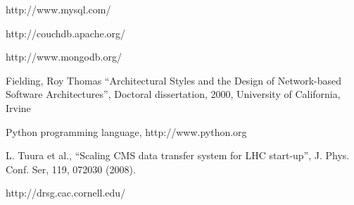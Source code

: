 \documentclass[3p,times]{elsarticle}
\begin{document}
\begin{thebibliography}{00}
http://www.mysql.com/

http://couchdb.apache.org/

http://www.mongodb.org/

Fielding, Roy Thomas ``Architectural Styles and the Design of 
Network-based Software Architectures'', Doctoral dissertation, 2000,
University of California, Irvine

 Python programming language, http://www.python.org

L. Tuura et al., 
``Scaling CMS data transfer system for LHC start-up'', 
J. Phys. Conf. Ser, 119, 072030 (2008).









http://drsg.cac.cornell.edu/
\end{thebibliography}
\end{document}
